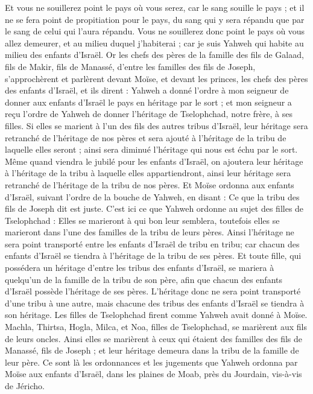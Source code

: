 \begin{multicols}{2}
Et vous ne souillerez point le pays où vous serez, car le sang souille le pays ; et il ne se fera point de propitiation pour le pays, du sang qui y sera répandu que par le sang de celui qui l'aura répandu.
Vous ne souillerez donc point le pays où vous allez demeurer, et au milieu duquel j'habiterai ; car je suis Yahweh qui habite au milieu des enfants d'Israël.
\VerseOne{}Or les chefs des pères de la famille des fils de Galaad, fils de Makir, fils de Manassé, d'entre les familles des fils de Joseph, s'approchèrent et parlèrent devant Moïse, et devant les princes, les chefs des pères des enfants d'Israël,
et ils dirent : Yahweh a donné l'ordre à mon seigneur de donner aux enfants d'Israël le pays en héritage par le sort ; et mon seigneur a reçu l'ordre de Yahweh de donner l'héritage de Tselophchad, notre frère, à ses filles.
Si elles se marient à l'un des fils des autres tribus d'Israël, leur héritage sera retranché de l'héritage de nos pères et sera ajouté à l'héritage de la tribu de laquelle elles seront ; ainsi sera diminué l'héritage qui nous est échu par le sort.
Même quand viendra le jubilé pour les enfants d'Israël, on ajoutera leur héritage à l'héritage de la tribu à laquelle elles appartiendront, ainsi leur héritage sera retranché de l'héritage de la tribu de nos pères.
Et Moïse ordonna aux enfants d'Israël, suivant l'ordre de la bouche de Yahweh, en disant : Ce que la tribu des fils de Joseph dit est juste.
C’est ici ce que Yahweh ordonne au sujet des filles de Tselophchad : Elles se marieront à qui bon leur semblera, toutefois elles se marieront dans l'une des familles de la tribu de leurs pères.
Ainsi l’héritage ne sera point transporté entre les enfants d'Israël de tribu en tribu; car chacun des enfants d'Israël se tiendra à l'héritage de la tribu de ses pères.
Et toute fille, qui possédera un héritage d’entre les tribus des enfants d'Israël, se mariera à quelqu'un de la famille de la tribu de son père, afin que chacun des enfants d'Israël possède l'héritage de ses pères.
L'héritage donc ne sera point transporté d'une tribu à une autre, mais chacune des tribus des enfants d'Israël se tiendra à son héritage.
Les filles de Tselophchad firent comme Yahweh avait donné à Moïse.
Machla, Thirtsa, Hogla, Milca, et Noa, filles de Tselophchad, se marièrent aux fils de leurs oncles.
Ainsi elles se marièrent à ceux qui étaient des familles des fils de Manassé, fils de Joseph ; et leur héritage demeura dans la tribu de la famille de leur père.
Ce sont là les ordonnances et les jugements que Yahweh ordonna par Moïse aux enfants d'Israël, dans les plaines de Moab, près du Jourdain, vis-à-vis de Jéricho.
\PPE{}
\end{multicols}

